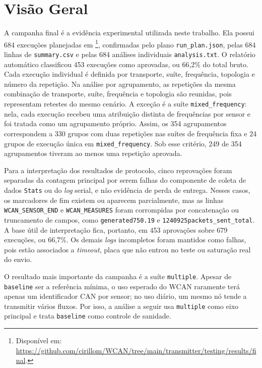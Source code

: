 \section{Visão Geral}

A campanha final é a evidência experimental utilizada neste trabalho. Ela possui
684 execuções planejadas em \footnote{Disponível em: \url{https://github.com/cirillom/WCAN/tree/main/transmitter/testing/results/final}.}, confirmadas
pelo plano \texttt{run\_plan.json}, pelas 684 linhas de \texttt{summary.csv} e
pelas 684 análises individuais \texttt{analysis.txt}. O relatório automático
classificou 453 execuções como aprovadas, ou 66,2\% do total bruto. Cada
execução individual é definida por transporte, suíte, frequência, topologia e
número da repetição. Na análise por agrupamento, as repetições da mesma
combinação de transporte, suíte, frequência e topologia são reunidas, pois
representam retestes do mesmo cenário. A exceção é a suíte \texttt{mixed\_frequency}:
nela, cada execução recebeu uma atribuição distinta de frequências por sensor e
foi tratada como um agrupamento próprio. Assim, os 354 agrupamentos correspondem
a 330 grupos com duas repetições nas suítes de frequência fixa e 24 grupos de
execução única em \texttt{mixed\_frequency}. Sob esse critério, 249 de 354
agrupamentos tiveram ao menos uma repetição aprovada.

Para a interpretação dos resultados de protocolo, cinco reprovações foram
separadas da contagem principal por serem falhas do componente de coleta de
dados \texttt{Stats} ou do
\emph{log} serial, e não evidência de perda de entrega. Nesses casos, os marcadores de
fim existem ou aparecem parcialmente, mas as linhas \texttt{WCAN\_SENSOR\_END} e
\texttt{WCAN\_MEASURES} foram corrompidas por concatenação ou truncamento de
campos, como \texttt{generated750.19} e \texttt{1240925packets\_sent\_total}. A
base útil de interpretação fica, portanto, em 453 aprovações sobre 679 execuções,
ou 66,7\%. Os demais \emph{logs} incompletos foram mantidos como falhas, pois estão
associados a \emph{timeout}, placa que não entrou no teste ou saturação real do envio.

O resultado mais importante da campanha é a suíte \texttt{multiple}. Apesar de
\texttt{baseline} ser a referência mínima, o uso esperado do WCAN raramente terá
apenas um identificador CAN por sensor; no uso diário, um mesmo nó tende a transmitir vários
fluxos. Por isso, a análise a seguir usa \texttt{multiple} como eixo principal e
trata \texttt{baseline} como controle de sanidade.

